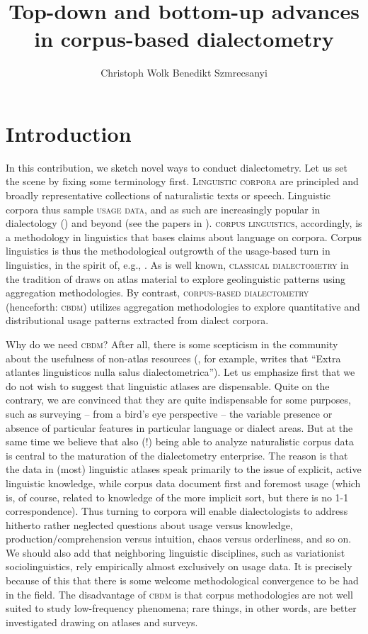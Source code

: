 \documentclass[output=paper]{LSP/langsci}
\author{Christoph Wolk\affiliation{?} \lastand Benedikt Szmrecsanyi\affiliation{?}}
\title{Top-down and bottom-up advances in corpus-based dialectometry}
\begin{document}
  

\section{Introduction}

In this contribution, we sketch novel ways to conduct dialectometry. Let us set the scene by fixing some terminology first. \textsc{Linguistic corpora} are principled and broadly representative collections of naturalistic texts or speech. Linguistic corpora thus sample \textsc{usage data}, and as such are increasingly popular in dialectology (\citealt{anderwald_corpus_2009,grieve_corpus-based_2009}) and beyond (see the papers in \citealt{szmrecsanyi_aggregating_2014}). \textsc{corpus linguistics}, accordingly, is a methodology in linguistics that bases claims about language on corpora. Corpus linguistics is thus the methodological outgrowth of the usage-based turn in linguistics, in the spirit of, e.g.,  \citet{bybee_language_2010,tomasello_constructing_2003}. As is well known, \textsc{classical dialectometry} in the tradition of \citet{goebl_dialektometrische_1984,nerbonne_edit_1999} draws on atlas material to explore geolinguistic patterns using aggregation methodologies. By contrast, \textsc{corpus-based dialectometry} (henceforth: \textsc{cbdm}) utilizes aggregation methodologies to explore quantitative and distributional usage patterns extracted from dialect corpora.

Why do we need \textsc{cbdm}? 
After all, there is some scepticism in the community about the usefulness of non-atlas resources (\citealt[499]{goebl_dialektometrie_2005}, for example, writes that ``Extra atlantes linguisticos nulla salus dialectometrica'').
Let us emphasize first that we do not wish to suggest that linguistic atlases are dispensable. 
Quite on the contrary, we are convinced that they are quite indispensable for some purposes, such as surveying -- from a bird's eye perspective -- the variable presence or absence of particular features in particular language or dialect areas.
But at the same time we believe that also (!) being able to analyze naturalistic corpus data is central to the maturation of the dialectometry enterprise.
The reason is that the data in (most) linguistic atlases speak primarily to the issue of explicit, active linguistic knowledge, while corpus data document first and foremost usage (which is, of course, related to knowledge of the more implicit sort, but there is no 1-1 correspondence).
Thus turning to corpora will enable dialectologists to address hitherto rather neglected questions about usage versus knowledge,  production/comprehension versus intuition, chaos versus orderliness, and so on. 
We should also add that neighboring linguistic disciplines, such as variationist sociolinguistics, rely empirically almost exclusively on usage data. 
It is precisely because of this that there is some welcome methodological convergence to be had in the field. 
The disadvantage of \textsc{cbdm} is that corpus methodologies are not well suited to study low-frequency phenomena; rare things, in other words, are better investigated drawing on atlases and surveys.
\end{document}
